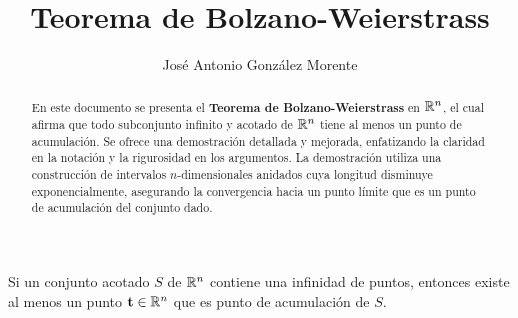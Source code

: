 \documentclass[a4paper,12pt]{article}
\title{Teorema de Bolzano-Weierstrass}
\author{José Antonio González Morente}
\begin{document}
\maketitle

\begin{abstract}
    En este documento se presenta el \textbf{Teorema de Bolzano-Weierstrass} en $\mathbb{R}^n$, el cual afirma que todo subconjunto infinito y acotado de $\mathbb{R}^n$ tiene al menos un punto de acumulación. Se ofrece una demostración detallada y mejorada, enfatizando la claridad en la notación y la rigurosidad en los argumentos. La demostración utiliza una construcción de intervalos $n$-dimensionales anidados cuya longitud disminuye exponencialmente, asegurando la convergencia hacia un punto límite que es un punto de acumulación del conjunto dado.
\end{abstract}

\begin{theorem}
Si un conjunto acotado $S$ de $\mathbb{R}^n$ contiene una infinidad de puntos, entonces existe al menos un punto $\mathbf{t} \in \mathbb{R}^n$ que es punto de acumulación de $S$.
\end{theorem}
\end{document}
